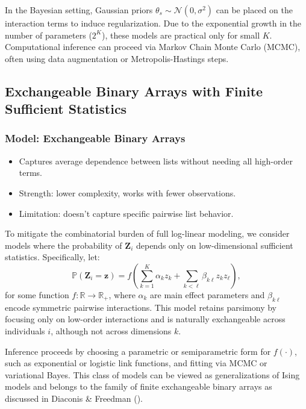 \documentclass[
  12pt,
]{article}
\providecommand{\tightlist}{%
  \setlength{\itemsep}{0pt}\setlength{\parskip}{0pt}}\usepackage{longtable,booktabs,array}
\theoremstyle{plain}
\theoremstyle{definition}
\begin{document}
In the Bayesian setting, Gaussian priors
\(\theta_s \sim \mathcal{N}(0, \sigma^2)\) can be placed on the
interaction terms to induce regularization. Due to the exponential
growth in the number of parameters (\(2^K\)), these models are practical
only for small \(K\). Computational inference can proceed via Markov
Chain Monte Carlo (MCMC), often using data augmentation or
Metropolis-Hastings steps.

\subsection{Exchangeable Binary Arrays with Finite Sufficient
Statistics}\label{exchangeable-binary-arrays-with-finite-sufficient-statistics}

\subsubsection{Model: Exchangeable Binary
Arrays}\label{model-exchangeable-binary-arrays}

\begin{itemize}
\tightlist
\item
  Captures average dependence between lists without needing all
  high-order terms.
\item
  Strength: lower complexity, works with fewer observations.
\item
  Limitation: doesn't capture specific pairwise list behavior.
\end{itemize}

To mitigate the combinatorial burden of full log-linear modeling, we
consider models where the probability of \(\mathbf{Z}_i\) depends only
on low-dimensional sufficient statistics. Specifically, let: \[
\mathbb{P}(\mathbf{Z}_i = \mathbf{z}) = f\left( \sum_{k=1}^K \alpha_k z_k + \sum_{k<\ell} \beta_{k\ell} z_k z_\ell \right),
\] for some function \(f: \mathbb{R} \rightarrow \mathbb{R}_+\), where
\(\alpha_k\) are main effect parameters and \(\beta_{k\ell}\) encode
symmetric pairwise interactions. This model retains parsimony by
focusing only on low-order interactions and is naturally exchangeable
across individuals \(i\), although not across dimensions \(k\).

Inference proceeds by choosing a parametric or semiparametric form for
\(f(\cdot)\), such as exponential or logistic link functions, and
fitting via MCMC or variational Bayes. This class of models can be
viewed as generalizations of Ising models and belongs to the family of
finite exchangeable binary arrays as discussed in Diaconis \& Freedman
().
\end{document}
